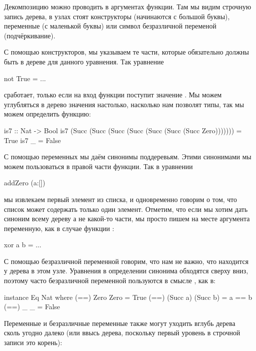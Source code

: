 Декомпозицию можно проводить в аргументах функции. Там мы
видим строчную запись дерева, в узлах стоят конструкторы
(начинаются с большой буквы), переменные (с маленькой буквы)
или символ безразличной переменой (подчёркивание).

С помощью конструкторов, мы указываем те части, которые
обязательно должны быть в дереве для данного уравнения. Так уравнение

\begin{code}
not True   = ...
\end{code}

\noindent сработает, только если на вход функции
поступит значение .
Мы можем углубляться в дерево значения настолько, насколько 
нам позволят типы, так мы можем определить функцию:

\begin{code}
is7 :: Nat -> Bool
is7  (Succ (Succ (Succ (Succ (Succ (Succ (Succ Zero)))))))  = True
is7  _                                                      = False
\end{code}

С помощью переменных мы даём синонимы поддеревьям. Этими синонимами
мы можем пользоваться в правой части функции. Так в уравнении 

\begin{code}
addZero (a:[])
\end{code}

\noindent мы извлекаем первый элемент из списка, и одновременно говорим
о том, что список может содержать только один элемент. 
Отметим, что если мы хотим дать синоним всему дереву а не какой-то части,
мы просто пишем на месте аргумента переменную, как в случае функции
:

\begin{code}
xor a b = ...
\end{code}

    
С помощью  безразличной переменной говорим, что нам не важно, что 
находится у дерева в этом узле. Уравнения в определении синонима
обходятся сверху вниз, поэтому часто безразличной переменной
пользуются в смысле , как в:

\begin{code}
instance Eq Nat where
    (==) Zero     Zero     = True
    (==) (Succ a) (Succ b) = a == b
    (==) _        _        = False
\end{code}

Переменные и безразличные переменные также могут уходить
вглубь дерева сколь угодно далеко (или ввысь дерева, поскольку
первый уровень в строчной записи это корень):

